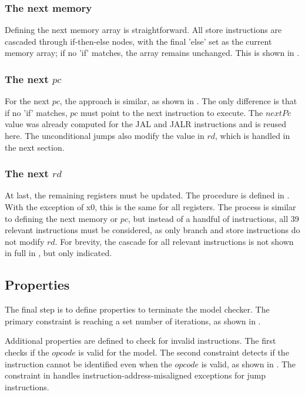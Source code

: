 

\subsubsection{The next memory}
Defining the next memory array is straightforward. All store
instructions are cascaded through if-then-else nodes, with the final
'else' set as the current memory array; if no 'if' matches, the array
remains unchanged. This is shown in .



\subsubsection{The next $pc$}
For the next $pc$, the approach is similar, as shown in
. The only difference is that if no 'if' matches,
$pc$ must point to the next instruction to execute. The $nextPc$
value was already computed for the JAL and JALR instructions and is
reused here. The unconditional jumps also modify the value in $rd$,
which is handled in the next section.



\subsubsection{The next $rd$}
At last, the remaining registers must be updated. The procedure is
defined in . With the exception of x0, this is the
same for all registers. The process is similar to defining the next
memory or $pc$, but instead of a handful of instructions, all 39
relevant instructions must be considered, as only branch and store
instructions do not modify $rd$. For brevity, the cascade for all
relevant instructions is not shown in full in ,
but only indicated.



\subsection{Properties}
The final step is to define properties to terminate the model
checker. The primary constraint is reaching a set number of
iterations, as shown in .

Additional properties are defined to check for invalid instructions.
The first checks if the $opcode$ is valid for the model. The second
constraint detects if the instruction cannot be identified even when
the $opcode$ is valid, as shown in . The
constraint in  handles
instruction-address-misaligned exceptions for jump instructions.

